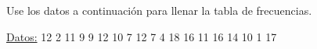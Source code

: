 \documentclass{cdplf-prueba}
\begin{document}
\subsection{}

Use los datos a continuación para llenar la tabla de frecuencias.

\underline{Datos:} \hspace{4pt} 12 \hspace{4pt}\textbullet\hspace{4pt} 2 \hspace{4pt}\textbullet\hspace{4pt} 11 \hspace{4pt}\textbullet\hspace{4pt} 9 \hspace{4pt}\textbullet\hspace{4pt} 9 \hspace{4pt}\textbullet\hspace{4pt} 12 \hspace{4pt}\textbullet\hspace{4pt} 10 \hspace{4pt}\textbullet\hspace{4pt} 7 \hspace{4pt}\textbullet\hspace{4pt} 12 \hspace{4pt}\textbullet\hspace{4pt} 7 \hspace{4pt}\textbullet\hspace{4pt} 4 \hspace{4pt}\textbullet\hspace{4pt} 18 \hspace{4pt}\textbullet\hspace{4pt} 16 \hspace{4pt}\textbullet\hspace{4pt} 11 \hspace{4pt}\textbullet\hspace{4pt} 16 \hspace{4pt}\textbullet\hspace{4pt} 14 \hspace{4pt}\textbullet\hspace{4pt} 10 \hspace{4pt}\textbullet\hspace{4pt} 1 \hspace{4pt}\textbullet\hspace{4pt} 17
\end{document}
